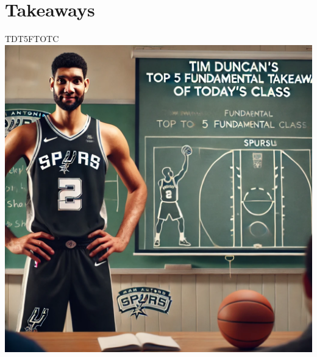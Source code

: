 \documentclass[aspectratio=169]{beamer}
\begin{document}
\section*{Takeaways}

\begin{frame}{TDT5FTOTC}
    \centering
    \includegraphics[height=0.9\textheight]{figures/tim.png}
\end{frame}
\end{document}
